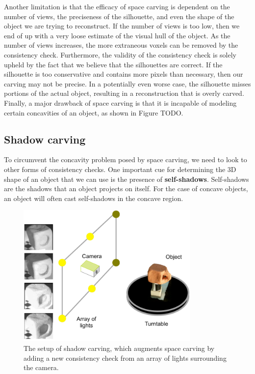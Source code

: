 \documentclass[a4paper, 12pt]{article}
\renewcommand\emph{\textbf}
\numberwithin{equation}{section}
\begin{document}
Another limitation is that the efficacy of space carving is dependent on the number of views, the preciseness of the silhouette, and even the shape of the object we are trying to reconstruct. If the number of views is too low, then we end of up with a very loose estimate of the visual hull of the object. As the number of views increases, the more extraneous voxels can be removed by the consistency check. Furthermore, the validity of the consistency check is solely upheld by the fact that we believe that the silhouettes are correct. If the silhouette is too conservative and contains more pixels than necessary, then our carving may not be precise. In a potentially even worse case, the silhouette misses portions of the actual object, resulting in a reconstruction that is overly carved. Finally, a major drawback of space carving is that it is incapable of modeling certain concavities of an object, as shown in Figure TODO.

\subsection{Shadow carving}
To circumvent the concavity problem posed by space carving, we need to look to other forms of consistency checks. One important cue for determining the 3D shape of an object that we can use is the presence of \emph{self-shadows}. Self-shadows are the shadows that an object projects on itself. For the case of concave objects, an object will often cast self-shadows in the concave region. 

\begin{figure}[h!]
    \centering
    \includegraphics[width = 0.8\textwidth]{figures/shadow_carving.png}
    \caption{The setup of shadow carving, which augments space carving by adding a new consistency check from an array of lights surrounding the camera.}
    \label{fig:shadow_carving}
\end{figure}
\end{document}
